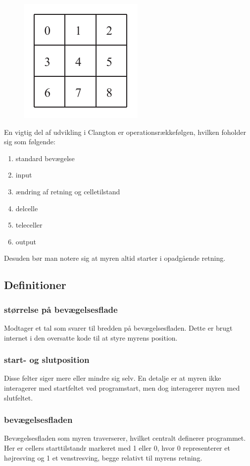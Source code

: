 \documentclass[11pt]{article}
\begin{document}
\begin{figure}[h]
\centering
\includegraphics[scale=1]{plane}%
\end{figure}

En vigtig del af udvikling i Clangton er operationsrækkefølgen, hvilken foholder sig som følgende:

\begin{enumerate}
	\item standard bevægelse
	\item input
	\item ændring af retning og celletilstand
	\item delcelle
	\item teleceller
	\item output
\end{enumerate}

Desuden bør man notere sig at myren altid starter i opadgående retning.

\subsection{Definitioner}
\subsubsection{størrelse på bevægelsesflade}
Modtager et tal som svarer til bredden på bevægelsesfladen. Dette er brugt internet i den oversatte kode til at styre myrens position.

\subsubsection{start- og slutposition}
Disse felter siger mere eller mindre sig selv. En detalje er at myren ikke interagerer med startfeltet ved programstart, men dog interagerer myren med slutfeltet.

\subsubsection{bevægelsesfladen}
Bevægelsesfladen som myren traverserer, hvilket centralt definerer programmet. Her er cellers starttilstandr markeret med 1 eller 0, hvor 0 representerer et højresving og 1 et venstresving, begge relativt til myrens retning.
\end{document}
